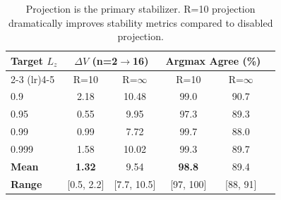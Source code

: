 \begin{table}[h]
\centering
\caption{Projection is the primary stabilizer. R=10 projection dramatically improves stability metrics compared to disabled projection.}
\label{tab:exp2_projection_stabilizer}
\begin{tabular}{lccccc}
\toprule
Target $L_z$ & \multicolumn{2}{c}{$\Delta V$ (n=2$\to$16)} & \multicolumn{2}{c}{Argmax Agree (\%)} \\
\cmidrule(lr){2-3} \cmidrule(lr){4-5}
 & R=10 & R=$\infty$ & R=10 & R=$\infty$ \\
\midrule
  0.9 & 2.18 & 10.48 & 99.0 & 90.7 \\
  0.95 & 0.55 & 9.95 & 97.3 & 89.3 \\
  0.99 & 0.99 & 7.72 & 99.7 & 88.0 \\
  0.999 & 1.58 & 10.02 & 99.3 & 89.7 \\
\midrule
  \textbf{Mean} & \textbf{1.32} & 9.54 & \textbf{98.8} & 89.4 \\
  \textbf{Range} & [0.5, 2.2] & [7.7, 10.5] & [97, 100] & [88, 91] \\
\bottomrule
\end{tabular}
\end{table}